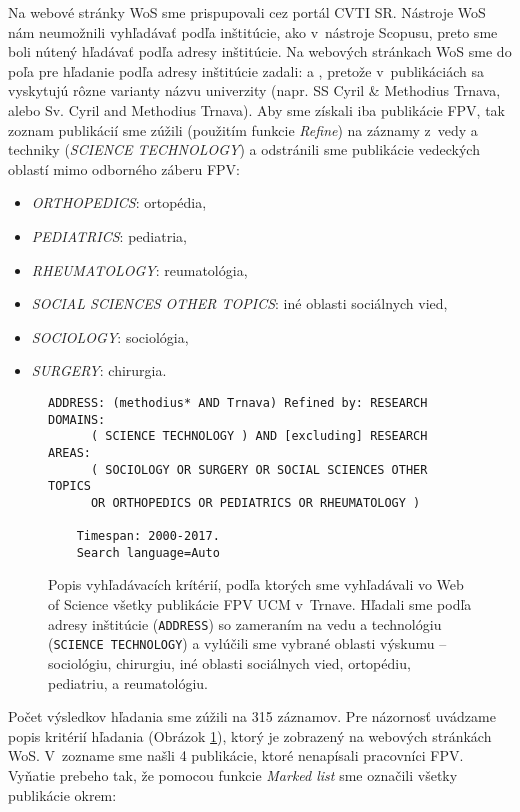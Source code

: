 Na webové stránky WoS sme prispupovali cez portál CVTI SR. Nástroje WoS nám
neumožnili vyhľadávať podľa inštitúcie, ako v~nástroje Scopusu, preto sme boli
nútený hľadávať podľa adresy inštitúcie. Na webových stránkach WoS sme do poľa
pre hľadanie podľa adresy inštitúcie zadali:  a ,
pretože v~publikáciách sa vyskytujú rôzne varianty názvu univerzity (napr. SS
Cyril \& Methodius Trnava, alebo Sv. Cyril and Methodius Trnava).  Aby sme
získali iba publikácie FPV, tak zoznam publikácií sme zúžili (použitím funkcie
\emph{Refine}) na záznamy z~vedy a techniky (\emph{SCIENCE TECHNOLOGY}) a
odstránili sme publikácie vedeckých oblastí mimo odborného záberu FPV:

\begin{itemize}
\item \emph{ORTHOPEDICS}: ortopédia,
\item \emph{PEDIATRICS}: pediatria,
\item \emph{RHEUMATOLOGY}: reumatológia,
\item \emph{SOCIAL SCIENCES OTHER TOPICS}: iné oblasti sociálnych vied,
\item \emph{SOCIOLOGY}: sociológia,
\item \emph{SURGERY}: chirurgia.
\end{itemize}

\begin{figure}
  \footnotesize
  \begin{Verbatim}[frame=single]
    ADDRESS: (methodius* AND Trnava) Refined by: RESEARCH DOMAINS:
      ( SCIENCE TECHNOLOGY ) AND [excluding] RESEARCH AREAS:
      ( SOCIOLOGY OR SURGERY OR SOCIAL SCIENCES OTHER TOPICS
      OR ORTHOPEDICS OR PEDIATRICS OR RHEUMATOLOGY )

    Timespan: 2000-2017.
    Search language=Auto
  \end{Verbatim}
  \vspace*{-4mm}
  \caption[Popis kritérií vyhľadávania vo WoS pre FPV]%
  {Popis vyhľadávacích krítérií, podľa ktorých sme vyhľadávali vo Web of Science
    všetky publikácie FPV UCM v~Trnave.  Hľadali sme podľa adresy inštitúcie
    (\texttt{ADDRESS}) so zameraním na vedu a technológiu (\texttt{SCIENCE
      TECHNOLOGY}) a vylúčili sme vybrané oblasti výskumu -- sociológiu,
    chirurgiu, iné oblasti sociálnych vied, ortopédiu, pediatriu, a
    reumatológiu.}
  \label{fig:wos.query}
\end{figure}


Počet výsledkov hľadania sme zúžili na 315 záznamov. Pre názornosť uvádzame
popis kritérií hľadania (Obrázok \ref{fig:wos.query}), ktorý je zobrazený na
webových stránkách WoS.  V~zozname sme našli 4 publikácie, ktoré nenapísali
pracovníci FPV.  Vyňatie prebeho tak, že pomocou funkcie \emph{Marked list} sme
označili všetky publikácie okrem:

